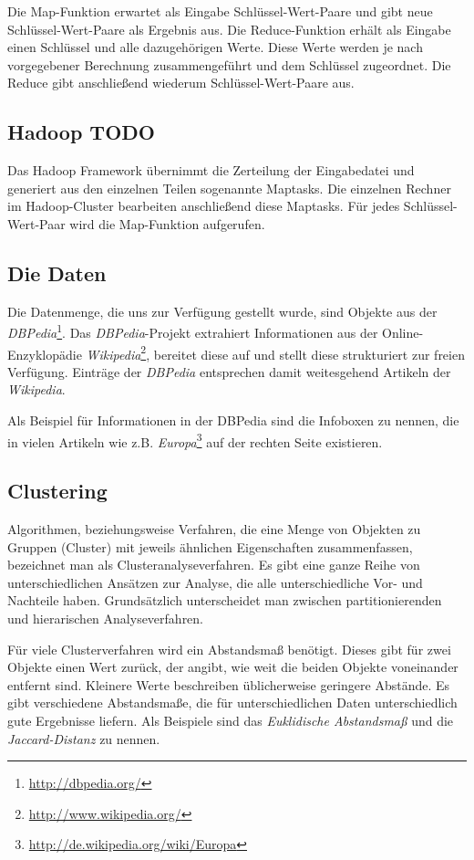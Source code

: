 \documentclass[a4paper]{llncs}
\begin{document}
Die Map-Funktion erwartet als Eingabe Schlüssel-Wert-Paare und gibt neue Schlüssel-Wert-Paare als Ergebnis aus.
Die Reduce-Funktion erhält als Eingabe einen Schlüssel und alle dazugehörigen Werte.
Diese Werte werden je nach vorgegebener Berechnung zusammengeführt und dem Schlüssel zugeordnet.
Die Reduce gibt anschließend wiederum Schlüssel-Wert-Paare aus.

\subsection{Hadoop TODO}
Das Hadoop Framework übernimmt die Zerteilung der Eingabedatei und generiert aus den einzelnen Teilen sogenannte Maptasks.
Die einzelnen Rechner im Hadoop-Cluster bearbeiten anschließend diese Maptasks.
Für jedes Schlüssel-Wert-Paar wird die Map-Funktion aufgerufen.

\subsection{Die Daten}
Die Datenmenge, die uns zur Verfügung gestellt wurde, sind Objekte aus der \emph{DBPedia}\footnote{\url{http://dbpedia.org/}}.
Das \emph{DBPedia}-Projekt extrahiert Informationen aus der Online-Enzyklopädie \emph{Wikipedia}\footnote{\url{http://www.wikipedia.org/}}, bereitet diese auf und stellt diese strukturiert zur freien Verfügung.
Einträge der \emph{DBPedia} entsprechen damit weitesgehend Artikeln der \emph{Wikipedia}.

Als Beispiel für Informationen in der DBPedia sind die Infoboxen zu nennen, die in vielen Artikeln wie z.B. \emph{Europa}\footnote{\url{http://de.wikipedia.org/wiki/Europa}} auf der rechten Seite existieren.

\subsection{Clustering}
Algorithmen, beziehungsweise Verfahren, die eine Menge von Objekten zu Gruppen (Cluster) mit jeweils ähnlichen Eigenschaften zusammenfassen, bezeichnet man als Clusteranalyseverfahren.
Es gibt eine ganze Reihe von unterschiedlichen Ansätzen zur Analyse, die alle unterschiedliche Vor- und Nachteile haben.
Grundsätzlich unterscheidet man zwischen partitionierenden und hierarischen Analyseverfahren.

Für viele Clusterverfahren wird ein Abstandsmaß benötigt. Dieses gibt für zwei Objekte einen Wert zurück, der angibt, wie weit die beiden Objekte voneinander entfernt sind. Kleinere Werte beschreiben üblicherweise geringere Abstände. Es gibt verschiedene Abstandsmaße, die für unterschiedlichen Daten unterschiedlich gute Ergebnisse liefern. Als Beispiele sind das \emph{Euklidische Abstandsmaß} und die \emph{Jaccard-Distanz} zu nennen.
\end{document}
